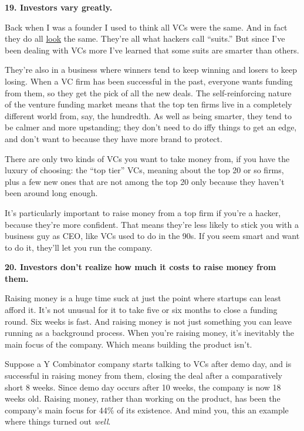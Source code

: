 \textbf{19. Investors vary greatly.}

Back when I was a founder I used to think all VCs were the same. And in
fact they do all \href{http://www.redpoint.com/team/}{look} the same.
They're all what hackers call ``suits.'' But since I've been dealing
with VCs more I've learned that some suits are smarter than others.

They're also in a business where winners tend to keep winning and losers
to keep losing. When a VC firm has been successful in the past, everyone
wants funding from them, so they get the pick of all the new deals. The
self-reinforcing nature of the venture funding market means that the top
ten firms live in a completely different world from, say, the hundredth.
As well as being smarter, they tend to be calmer and more upstanding;
they don't need to do iffy things to get an edge, and don't want to
because they have more brand to protect.

There are only two kinds of VCs you want to take money from, if you have
the luxury of choosing: the ``top tier'' VCs, meaning about the top 20
or so firms, plus a few new ones that are not among the top 20 only
because they haven't been around long enough.

It's particularly important to raise money from a top firm if you're a
hacker, because they're more confident. That means they're less likely
to stick you with a business guy as CEO, like VCs used to do in the 90s.
If you seem smart and want to do it, they'll let you run the company.

\textbf{20. Investors don't realize how much it costs to raise money
from them.}

Raising money is a huge time suck at just the point where startups can
least afford it. It's not unusual for it to take five or six months to
close a funding round. Six weeks is fast. And raising money is not just
something you can leave running as a background process. When you're
raising money, it's inevitably the main focus of the company. Which
means building the product isn't.

Suppose a Y Combinator company starts talking to VCs after demo day, and
is successful in raising money from them, closing the deal after a
comparatively short 8 weeks. Since demo day occurs after 10 weeks, the
company is now 18 weeks old. Raising money, rather than working on the
product, has been the company's main focus for 44\% of its existence.
And mind you, this an example where things turned out \emph{well}.

